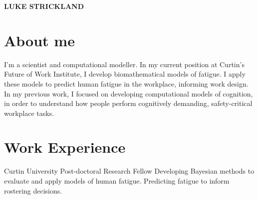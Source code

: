 \documentclass[10pt]{article} %
\begin{document}
\begin{paracol}{2} %


\parbox[top][0.00\textheight][c]{\linewidth}{ 
	\vspace{-0.04\textheight} %
	\centering %
	{\Huge \textbf{LUKE STRICKLAND}}
        }


\section{About me}
I'm a scientist and computational modeller. In my current position at Curtin’s Future of Work Institute, I develop biomathematical models of fatigue. I apply these models to predict human fatigue in the workplace, informing work design. In my previous work, I focused on developing computational models of cognition, in order to understand how people perform cognitively demanding, safety-critical workplace tasks.






\section{Work Experience}

{} %
{Curtin University} %
{Post-doctoral Research Fellow}
{Developing Bayesian methods to evaluate and apply models of human fatigue. Predicting fatigue to inform  rostering decisions.} %


\end{paracol}
\end{document}
